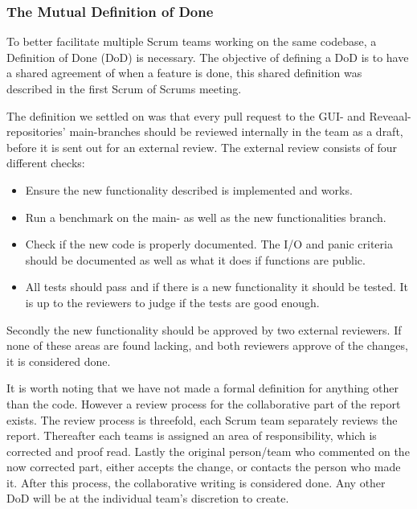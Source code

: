 \subsubsection{The Mutual Definition of Done}
To better facilitate multiple Scrum teams working on the same codebase, a Definition of Done (DoD) is necessary. The objective of defining a DoD is to have a shared agreement of when a feature is done, this shared definition was described in the first Scrum of Scrums meeting.

The definition we settled on was that every pull request to the GUI- and Reveaal-repositories' main-branches should be reviewed internally in the team as a draft, before it is sent out for an external review.
The external review consists of four different checks:
\begin{itemize}
    \item Ensure the new functionality described is implemented and works.
    \item Run a benchmark on the main- as well as the new functionalities branch.
    \item Check if the new code is properly documented. The I/O and panic criteria should be documented as well as what it does if functions are public.
    \item All tests should pass and if there is a new functionality it should be tested. It is up to the reviewers to judge if the tests are good enough.
\end{itemize}
Secondly the new functionality should be approved by two external reviewers.
If none of these areas are found lacking, and both reviewers approve of the changes, it is considered done.

It is worth noting that we have not made a formal definition for anything other than the code. However a review process for the collaborative part of the report exists. The review process is threefold, each Scrum team separately reviews the report. Thereafter each teams is assigned an area of responsibility, which is corrected and proof read. Lastly the original person/team who commented on the now corrected part, either accepts the change, or contacts the person who made it. After this process, the collaborative writing is considered done.
Any other DoD will be at the individual team's discretion to create.


